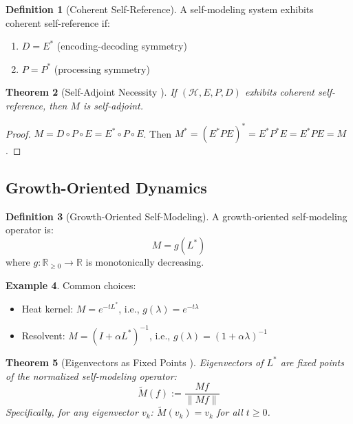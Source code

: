 \documentclass[11pt,a4paper]{article}
\theoremstyle{plain}
\newtheorem{theorem}{Theorem}[section]
\theoremstyle{definition}
\newtheorem{definition}[theorem]{Definition}
\newtheorem{example}[theorem]{Example}
\theoremstyle{remark}
\newcommand{\R}{\mathbb{R}}
\newcommand{\Hilbert}{\mathcal{H}}
\newcommand{\Laplacian}{L^*}
\newcommand{\norm}[1]{\| #1 \|}
\begin{document}
\begin{definition}[Coherent Self-Reference]\label{def:coherent}
A self-modeling system exhibits coherent self-reference if:
\begin{enumerate}[label=(\roman*),noitemsep]
    \item $D = E^*$ (encoding-decoding symmetry)
    \item $P = P^*$ (processing symmetry)
\end{enumerate}
\end{definition}

\begin{theorem}[Self-Adjoint Necessity \cite{bsc2026eb}]\label{thm:selfadjoint}
If $(\Hilbert, E, P, D)$ exhibits coherent self-reference, then $M$ is self-adjoint.
\end{theorem}

\begin{proof}
$M = D \circ P \circ E = E^* \circ P \circ E$. Then $M^* = (E^* P E)^* = E^* P^* E = E^* P E = M$.
\end{proof}

\subsection{Growth-Oriented Dynamics}

\begin{definition}[Growth-Oriented Self-Modeling]\label{def:growth}
A growth-oriented self-modeling operator is:
\begin{equation}
M = g(\Laplacian)
\end{equation}
where $g : \R_{\geq 0} \to \R$ is monotonically decreasing.
\end{definition}

\begin{example}
Common choices:
\begin{itemize}[noitemsep]
    \item Heat kernel: $M = e^{-t\Laplacian}$, i.e., $g(\lambda) = e^{-t\lambda}$
    \item Resolvent: $M = (I + \alpha \Laplacian)^{-1}$, i.e., $g(\lambda) = (1 + \alpha\lambda)^{-1}$
\end{itemize}
\end{example}

\begin{theorem}[Eigenvectors as Fixed Points \cite{bsc2026sat}]\label{thm:fixedpoints}
Eigenvectors of $\Laplacian$ are fixed points of the normalized self-modeling operator:
\[
\widetilde{M}(f) := \frac{Mf}{\norm{Mf}}
\]
Specifically, for any eigenvector $v_k$: $\widetilde{M}(v_k) = v_k$ for all $t \geq 0$.
\end{theorem}
\end{document}
